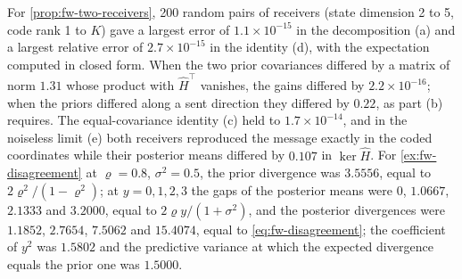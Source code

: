 \begin{numcheck}\label{chk:fw-two-receivers}
For \cref{prop:fw-two-receivers}, 200 random pairs of receivers (state dimension 2 to 5, code rank 1 to $K$) gave a largest error of $1.1\times10^{-15}$ in the decomposition (a) and a largest relative error of $2.7\times10^{-15}$ in the identity (d), with the expectation computed in closed form. When the two prior covariances differed by a matrix of norm $1.31$ whose product with $\hat H^\top$ vanishes, the gains differed by $2.2\times10^{-16}$; when the priors differed along a sent direction they differed by $0.22$, as part (b) requires. The equal-covariance identity (c) held to $1.7\times10^{-14}$, and in the noiseless limit (e) both receivers reproduced the message exactly in the coded coordinates while their posterior means differed by $0.107$ in $\ker\hat H$. For \cref{ex:fw-disagreement} at $\varrho=0.8$, $\sigma^2=0.5$, the prior divergence was $3.5556$, equal to $2\varrho^2/(1-\varrho^2)$; at $y=0,1,2,3$ the gaps of the posterior means were $0$, $1.0667$, $2.1333$ and $3.2000$, equal to $2\varrho y/(1+\sigma^2)$, and the posterior divergences were $1.1852$, $2.7654$, $7.5062$ and $15.4074$, equal to \eqref{eq:fw-disagreement}; the coefficient of $y^2$ was $1.5802$ and the predictive variance at which the expected divergence equals the prior one was $1.5000$.
\end{numcheck}


